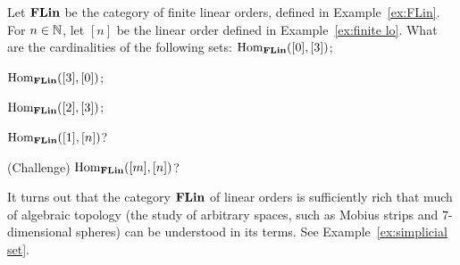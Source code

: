 \documentclass[CT4S-EN-RU]{subfiles}
\begin{document}
\begin{exampleRUS}\label{ex:FLin}
\end{exampleRUS}

\begin{exerciseENG}
Let ${\mathbf{FLin}}$ be the category of finite linear orders, defined in Example~\ref{ex:FLin}. For $n\in{\mathbb N}$, let $[n]$ be the linear order defined in Example~\ref{ex:finite lo}. What are the cardinalities of the following sets: 
\sexc $\textnormal{Hom}_{{\mathbf{FLin}}}([0],[3])$; 
\item $\textnormal{Hom}_{\mathbf{FLin}}([3],[0])$;
\item $\textnormal{Hom}_{\mathbf{FLin}}([2],[3])$;
\item $\textnormal{Hom}_{\mathbf{FLin}}([1],[n])$?
\item (Challenge) $\textnormal{Hom}_{\mathbf{FLin}}([m],[n])$?
\endsexc

It turns out that the category ${\mathbf{FLin}}$ of linear orders is sufficiently rich that much of algebraic topology (the study of arbitrary spaces, such as Mobius strips and $7$-dimensional spheres) can be understood in its terms. See Example~\ref{ex:simplicial set}.
\end{exerciseENG}

\begin{exerciseRUS}
\end{exerciseRUS}
\end{document}
